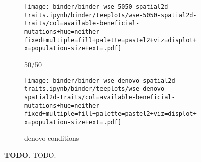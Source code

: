 \begin{figure}[h]
    \begin{subfigure}[b]{\linewidth}
        \begin{minipage}{\textwidth}
          \texttt{[image: binder/binder-wse-5050-spatial2d-traits.ipynb/binder/teeplots/wse-5050-spatial2d-traits/col=available-beneficial-mutations+hue=neither-fixed+multiple=fill+palette=pastel2+viz=displot+x=population-size+ext=.pdf]}%
        \end{minipage}
        \begin{minipage}{\textwidth}
        \caption{50/50}
        \label{fig:neither-fixed-wse:5050}
        \end{minipage}%
    \end{subfigure}

    \begin{subfigure}[b]{\linewidth}
        \begin{minipage}{\textwidth}
          \texttt{[image: binder/binder-wse-denovo-spatial2d-traits.ipynb/binder/teeplots/wse-denovo-spatial2d-traits/col=available-beneficial-mutations+hue=neither-fixed+multiple=fill+palette=pastel2+viz=displot+x=population-size+ext=.pdf]}%
        \end{minipage}
        \begin{minipage}{\textwidth}
        \caption{denovo conditions}
        \label{fig:neither-fixed-wse:denovo}
        \end{minipage}%
    \end{subfigure}%

  \begin{minipage}{\textwidth}
    \caption{%
      \textbf{TODO.}
      \footnotesize
     TODO.
    }
    \label{fig:neither-fixed-wse}
  \end{minipage}
\end{figure}